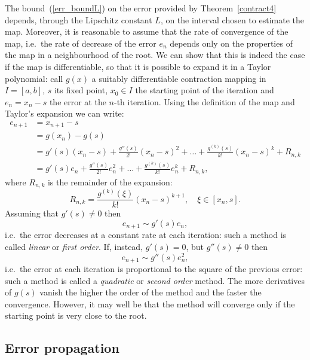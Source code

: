 The bound~(\ref{err_boundL}) on the error provided by
Theorem~\ref{contract4} depends, through the Lipschitz constant $L$,
on the interval chosen to estimate the map.  Moreover, it is
reasonable to assume that the rate of convergence of the map, i.e.\ the
rate of decrease of the error $e_n$ depends only on the properties of
the map in a neighbourhood of the root.  We can show that this is
indeed the case if the map is differentiable, so that it is possible
to expand it in a Taylor polynomial: call $g(x)$ a suitably
differentiable contraction mapping in $I=[a,b]$, $s$ its fixed point,
$x_0 \in I$ the starting point of the iteration and $e_n = x_n - s$
the error at the $n$-th iteration.  Using the definition of the map
and Taylor's expansion we can write:
%
\begin{align*}
  e_{n+1} & = x_{n+1} - s \\
          & = g(x_n) - g(s) \\
          & = g'(s)(x_n-s) + \frac{g''(s)}{2!}(x_n-s)^2 + \ldots +
          \frac{g^{(k)}(s)}{k!}(x_n-s)^k + R_{n,k} \\
          & = g'(s) e_n + \frac{g''(s)}{2!} e_n^2 + \ldots +
          \frac{g^{(k)}(s)}{k!} e_n^k + R_{n,k} ,
\end{align*}
%
where $R_{n,k}$ is the remainder of the expansion:
%
\begin{equation*}
  R_{n,k} = \frac{g^{(k)}(\xi)}{k!}(x_n-s)^{k+1}, \quad
  \xi \in [x_n,s].
\end{equation*}
%
Assuming that $g'(s) \ne 0$ then
%
\begin{equation*}
  e_{n+1} \sim g'(s) e_n,
\end{equation*}
%
i.e.\ the error decreases at a constant rate at each iteration: such a
method is called \textit{linear} or \textit{first order}.  If,
instead, $g'(s)=0$, but $g''(s) \ne 0$ then
%
\begin{equation*}
  e_{n+1} \sim g''(s) e_n^2,
\end{equation*}
%
i.e.\ the error at each iteration is proportional to the square of the
previous error: such a method is called a \textit{quadratic} or
\textit{second order} method.  The more derivatives of $g(s)$ vanish
the higher the order of the method and the faster the convergence.
However, it may well be that the method will converge only if the
starting point is very close to the root.

\subsection{Error propagation}

